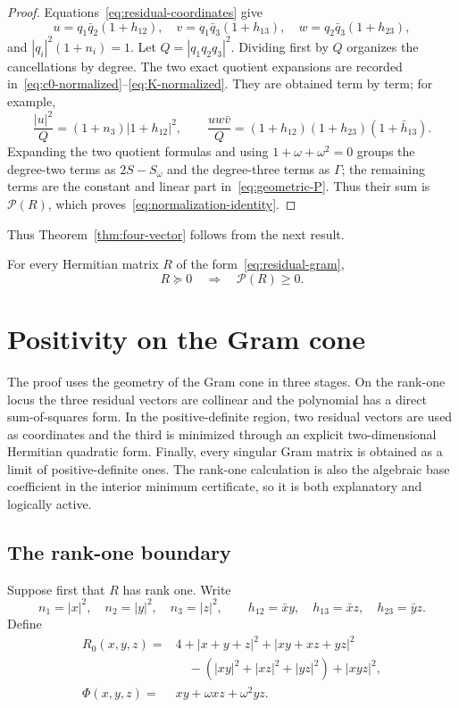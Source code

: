 \documentclass[10pt,twoside]{siamart1116}
\newcommand{\psd}{\succeq 0}
\begin{document}
\begin{proof}
Equations~\eqref{eq:residual-coordinates} give
\[
 u=q_1\bar q_2(1+h_{12}),\quad
 v=q_1\bar q_3(1+h_{13}),\quad
 w=q_2\bar q_3(1+h_{23}),
\]
and $|q_i|^2(1+n_i)=1$.  Let $Q=|q_1q_2q_3|^2$.  Dividing first by $Q$
organizes the cancellations by degree.  The two exact quotient expansions
are recorded in~\eqref{eq:c0-normalized}--\eqref{eq:K-normalized}.
They are obtained term by term;
for example,
\[
 \frac{|u|^2}{Q}=(1+n_3)|1+h_{12}|^2,\qquad
 \frac{uw\bar v}{Q}=(1+h_{12})(1+h_{23})(1+\bar h_{13}).
\]
Expanding the two quotient formulas and using
$1+\omega+\omega^2=0$ groups the degree-two terms as $2S-S_\omega$ and the
degree-three terms as $\Gamma$; the remaining terms are the constant and
linear part in~\eqref{eq:geometric-P}.  Thus their sum is
$\mathcal P(R)$, which proves~\eqref{eq:normalization-identity}.
\end{proof}

Thus Theorem~\ref{thm:four-vector} follows from the next result.

\begin{theorem}\label{thm:Ppositive}
For every Hermitian matrix $R$ of the form~\eqref{eq:residual-gram},
\[
 R\psd\quad\Longrightarrow\quad\mathcal P(R)\geq0.
\]
\end{theorem}

\section{Positivity on the Gram cone}\label{sec:Ppositive}

The proof uses the geometry of the Gram cone in three stages.  On the
rank-one locus the three residual vectors are collinear and the polynomial
has a direct sum-of-squares form.  In the positive-definite region, two
residual vectors are used as coordinates and the third is minimized through
an explicit two-dimensional Hermitian quadratic form.  Finally, every
singular Gram matrix is obtained as a limit of positive-definite ones.  The
rank-one calculation is also the algebraic base coefficient in the interior
minimum certificate, so it is both explanatory and logically active.

\subsection{The rank-one boundary}

Suppose first that $R$ has rank one.  Write
\[
 n_1=|x|^2,\quad n_2=|y|^2,\quad n_3=|z|^2,\qquad
 h_{12}=\bar xy,\quad h_{13}=\bar xz,\quad h_{23}=\bar yz.
\]
Define
\begin{align}
 R_0(x,y,z)={}&4+|x+y+z|^2+|xy+xz+yz|^2\nonumber\\
 &\quad-(|xy|^2+|xz|^2+|yz|^2)+|xyz|^2,\label{eq:R0}\\
 \Phi(x,y,z)={}&xy+\omega xz+\omega^2yz.
\end{align}
\end{document}
